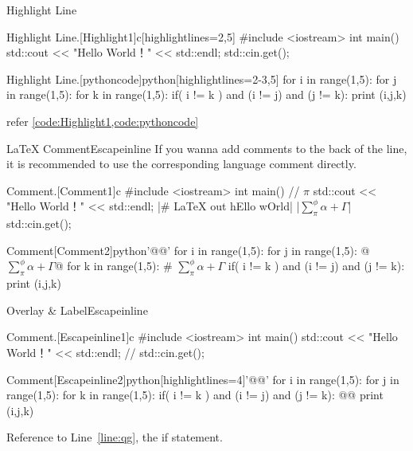 \documentclass[hyperref, UTF8, CJK, aspectratio=169]{beamer}
\begin{document}
\begin{frame}[fragile]{Highlight Line}
	\begin{scucode}{Highlight Line.}[Highlight1]{c}[highlightlines={2,5}]
		#include <iostream>
		int main()
		{
			std::cout << "Hello World！" << std::endl;
			std::cin.get();
		}
	\end{scucode}
	\begin{scucode}{Highlight Line.}[pythoncode]{python}[highlightlines={2-3,5}]
		for i in range(1,5):
			for j in range(1,5):
				for k in range(1,5):
					if( i != k ) and (i != j) and (j != k):
						print (i,j,k)
	\end{scucode}
  refer \vref{code:Highlight1,code:pythoncode}
\end{frame}

\begin{frame}[fragile]{\LaTeX{} Comment}{Escapeinline}
	If you wanna add comments to the back of the line, it is recommended to use the corresponding language comment directly.
	\begin{scucode}{Comment.}[Comment1]{c}
		#include <iostream>
		int main()
		{// $\pi$
			std::cout << "Hello World！" << std::endl; |\# \textsf{\LaTeX{} out hEllo wOrld}|
			|\colorbox{scugreen!60}{$\sum_\pi^\phi \alpha + \Gamma$}| std::cin.get(); 
		}
	\end{scucode}
	\begin{scucode}{Comment}[Comment2]{python}'@@'
		for i in range(1,5):
			for j in range(1,5): @$\sum_\pi^\phi \alpha + \Gamma$@
				for k in range(1,5): # $\sum_\pi^\phi \alpha + \Gamma$
					if( i != k ) and (i != j) and (j != k):
						print (i,j,k)
	\end{scucode}
\end{frame}

\begin{frame}[fragile]{Overlay \& Label}{Escapeinline}
	\begin{scucode}{Comment.}[Escapeinline1]{c}
		#include <iostream>
		int main()
		{
			std::cout << "Hello World！" << std::endl; // \only<2>{Value 2}
			std::cin.get();
		}
	\end{scucode}
	\begin{scucode}{Comment}[Escapeinline2]{python}[highlightlines={4}]'@@'
		for i in range(1,5):
			for j in range(1,5): 
				for k in range(1,5):
					if( i != k ) and (i != j) and (j != k): @\label{line:qg}@
						print (i,j,k)
	\end{scucode}
  Reference to Line~\ref{line:qg}, the if statement.
\end{frame}
\end{document}
